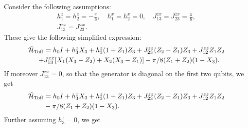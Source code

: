 Consider the following assumptions:
\begin{equation}
\begin{gathered}
  h_1^z = h_2^z = -\frac{\pi}{8},\quad
  h_1^x = h_2^x = 0,
  \quad J_{13}^{zx} = J_{23}^{zx} = \frac{\pi}{8}, \\
  J_{13}^{xx} = J_{23}^{xx}.
\end{gathered}
\end{equation}
These give the following simplified expression:
\begin{equation}
\begin{aligned}
  \tilde{{\mathcal{H}}}_{\operatorname{Toff}} &= h_0 I + h_3^x X_3 + h_3^z(1+ Z_1)Z_3
  + J_{23}^{zz}(Z_2 - Z_1)Z_3 + J_{12}^{zz} Z_1 Z_2 \\
  + &J_{13}^{xx} [X_1(X_3 - Z_2) + X_2(X_3 - Z_1)]
  - \pi/8 ( Z_1 +  Z_2)(1 - X_3).
\end{aligned}
\end{equation}
If moreover $J_{13}^{xx}=0$, so that the generator is diagonal on the first two qubits, we get
\begin{equation}
\begin{aligned}
    \tilde{{\mathcal{H}}}_{\operatorname{Toff}} &= h_0 I + h_3^x X_3 + h_3^z(1+ Z_1)Z_3
    + J_{23}^{zz}(Z_2 - Z_1)Z_3 + J_{12}^{zz} Z_1 Z_2\\
    &- \pi/8 (Z_1 +  Z_2)(1 - X_3).
\end{aligned}
\end{equation}
Further assuming $h_3^z=0$, we get

